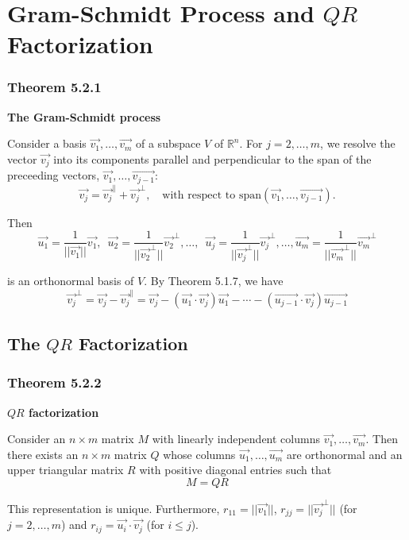\documentclass{report}
\begin{document}
\section{Gram-Schmidt Process and $QR$ Factorization}
\subsubsection*{Theorem 5.2.1}
\par\noindent\textbf{The Gram-Schmidt process}
\par\noindent Consider a basis $\vec{v_{1}},\ldots{},\vec{v_{m}}$ of a subspace $V$ of $\mathbb{R}^{n}$. For $j=2,\ldots{},m$, we resolve the vector $\vec{v_{j}}$ into its components parallel and perpendicular to the span of the preceeding vectors, $\vec{v_{1}},\ldots{},\vec{v_{j-1}}$:
\[\vec{v_{j}}=\vec{v_{j}}^{\parallel}+\vec{v_{j}}^{\perp},\quad{}\textrm{with respect to }\textrm{span}(\vec{v_{1}},\ldots{},\vec{v_{j-1}}).\]
\par\noindent Then
\[\vec{u_{1}}=\frac{1}{||\vec{v_{1}}||}\vec{v_{1}},\enspace{}\vec{u_{2}}=\frac{1}{||\vec{v_{2}}^{\perp}||}\vec{v_{2}}^{\perp},\ldots{},\enspace{}\vec{u_{j}}=\frac{1}{||\vec{v_{j}}^{\perp}||}\vec{v_{j}}^{\perp},\ldots{},\vec{u_{m}}=\frac{1}{||\vec{v_{m}}^{\perp}||}\vec{v_{m}}^{\perp}\]
\par\noindent is an orthonormal basis of $V$. By Theorem 5.1.7, we have
\[\vec{v_{j}}^{\perp}=\vec{v_{j}}-\vec{v_{j}}^{\parallel}=\vec{v_{j}}-(\vec{u_{1}}\cdot{}\vec{v_{j}})\vec{u_{1}}-\cdots{}-(\vec{u_{j-1}}\cdot{}\vec{v_{j}})\vec{u_{j-1}}\]
\subsection*{The $QR$ Factorization}
\subsubsection*{Theorem 5.2.2}
\par\noindent\textbf{$QR$ factorization}
\par\noindent Consider an $n\times{}m$ matrix $M$ with linearly independent columns $\vec{v_{1}},\ldots{},\vec{v_{m}}$. Then there exists an $n\times{}m$ matrix $Q$ whose columns $\vec{u_{1}},\ldots{},\vec{u_{m}}$ are orthonormal and an upper triangular matrix $R$ with positive diagonal entries such that
\[M=QR\]
\par\noindent This representation is unique. Furthermore, $r_{11}=||\vec{v_{1}}||$, $r_{jj}=||\vec{v_{j}}^{\perp}||$ (for $j=2,\ldots{},m$) and $r_{ij}=\vec{u_{i}}\cdot{}\vec{v_{j}}$ (for $i\le{}j$).
\end{document}
